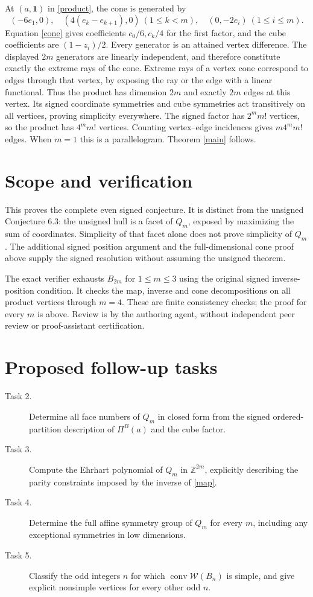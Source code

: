 \documentclass[11pt]{article}
\newcommand{\conv}{\operatorname{conv}}
\newcommand{\W}{\mathcal W}
\begin{document}
At $(a,\mathbf1)$ in \eqref{product}, the cone is generated by
\[
 (-6e_1,0),\quad (4(e_k-e_{k+1}),0)\ (1\leq k<m),\quad
 (0,-2e_i)\ (1\leq i\leq m).
\]
Equation \eqref{cone} gives coefficients $c_0/6,c_k/4$ for the first
factor, and the cube coefficients are $(1-z_i)/2$. Every generator is
an attained vertex difference. The displayed $2m$ generators are linearly
independent, and therefore constitute exactly the extreme rays of the
cone. Extreme rays of a vertex cone correspond to edges through that
vertex, by exposing the ray or the edge with a linear functional.
Thus the product has dimension $2m$ and exactly $2m$ edges at this vertex.
Its signed coordinate symmetries and cube symmetries act transitively
on all vertices, proving simplicity everywhere. The signed factor has
$2^m m!$ vertices, so the product has $4^m m!$ vertices. Counting
vertex--edge incidences gives $m4^m m!$ edges. When $m=1$ this is a
parallelogram. Theorem \ref{main} follows.

\section*{Scope and verification}
This proves the complete even signed conjecture. It is distinct from
the unsigned Conjecture 6.3: the unsigned hull is a facet of $Q_m$,
exposed by maximizing the sum of coordinates. Simplicity of that facet
alone does not prove simplicity of $Q_m$. The additional signed
position argument and the full-dimensional cone proof above supply
the signed resolution without assuming the unsigned theorem.

The exact verifier exhausts $B_{2m}$ for $1\leq m\leq3$ using the
original signed inverse-position condition. It checks the map, inverse
and cone decompositions on all product vertices through $m=4$.
These are finite consistency checks; the proof for every $m$ is above.
Review is by the authoring agent, without independent peer review or
proof-assistant certification.

\section*{Proposed follow-up tasks}
\begin{description}
\item[Task 2.] Determine all face numbers of $Q_m$ in closed form from
the signed ordered-partition description of $\Pi^B(a)$ and the cube factor.
\item[Task 3.] Compute the Ehrhart polynomial of $Q_m$ in
$\mathbb Z^{2m}$, explicitly describing the parity constraints imposed
by the inverse of \eqref{map}.
\item[Task 4.] Determine the full affine symmetry group of $Q_m$ for
every $m$, including any exceptional symmetries in low dimensions.
\item[Task 5.] Classify the odd integers $n$ for which
$\conv\W(B_n)$ is simple, and give explicit nonsimple vertices for
every other odd $n$.
\end{description}
\end{document}
